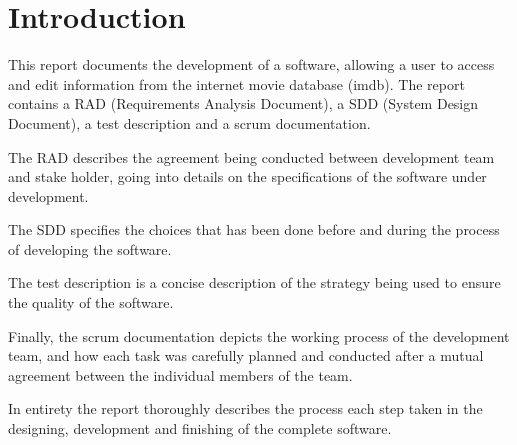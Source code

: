 \chapter{Introduction}
This report documents the development of a software, allowing a user to access and edit information from the internet movie database (imdb).
The report contains a RAD (Requirements Analysis Document), a SDD (System Design Document), a test description and a scrum documentation.

The RAD describes the agreement being conducted between development team and stake holder, going into details on the specifications of the software under development.

The SDD specifies the choices that has been done before and during the process of developing the software.

The test description is a concise description of the strategy being used to ensure the quality of the software.

Finally, the scrum documentation depicts the working process of the development team, and how each task was carefully planned and conducted after a mutual agreement between the individual members of the team.

In entirety the report thoroughly describes the process each step taken in the designing, development and finishing of the complete software.

